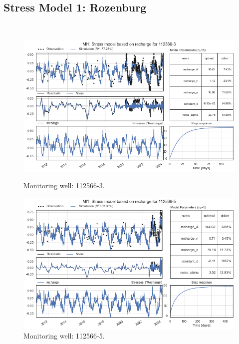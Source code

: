 \newpage
\subsection{Stress Model 1: Rozenburg}\\

\begin{figure}[htbp]
    \centering
    \begin{minipage}{0.32\textwidth}
        \centering
        \includegraphics[width=\linewidth]{frontmatter/Rozenburg-fig/1.png}
        \caption{Monitoring well: 112566-3.}
        \label{fig:112565-3}
    \end{minipage}
    \hfill
    \begin{minipage}{0.32\textwidth}
        \centering
        \includegraphics[width=\linewidth]{frontmatter/Rozenburg-fig/2.png}
        \caption{Monitoring well: 112566-5.}
        \label{fig:112565-3}
    \end{minipage}
    \hfill

\end{figure}
